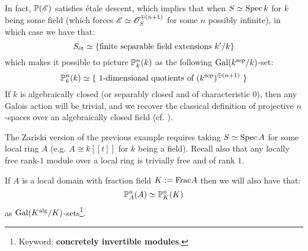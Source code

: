             \begin{example}
                In fact, $\P(\scrE)$ satisfies \'etale descent, which implies that when $S \cong \Spec k$ for $k$ being some field (which forces $\scrE \cong \scrO_S^{\oplus (n + 1)}$ for some $n$ possibly infinite), in which case we have that:
                    $$S_{\et} \cong \{ \text{finite separable field extensions $k'/k$} \}$$
                which makes it possible to picture $\P^n_k(k)$ as the following $\Gal(k^{\sep}/k)$-set:
                    $$\P^n_k(k) \cong \{ \text{ $1$-dimensional quotients of $(k^{\sep})^{\oplus (n + 1)}$ } \}$$
                If $k$ is algebraically closed (or separably closed and of characteristic $0$), then any Galois action will be trivial, and we recover the classical definition of projective $n$-spaces over an algebraically closed field (cf. \cite[Chapter 1]{hartshorne}).
            \end{example}
            \begin{example}
                The Zariski version of the previous example requires taking $S \cong \Spec A$ for some local ring $A$ (e.g. $A \cong k[\![t]\!]$ for $k$ being a field). Recall also that any locally free rank-$1$ module over a local ring is trivially free and of rank $1$.
                
                If $A$ is a local domain with fraction field $K := \Frac A$ then we will also have that:
                    $$\P^n_A(A) \cong \P^n_K(K)$$
                as $\Gal(K^{\alg}/K)$-sets\footnote{Keyword: \textbf{concretely invertible modules}.}.
            \end{example}
    
